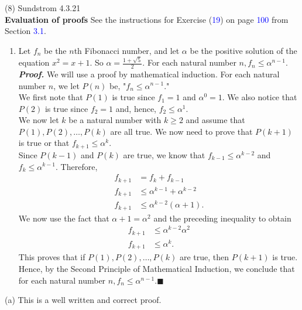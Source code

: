 \documentclass{article}
\begin{document}
(8) Sundstrom 4.3.21\\
\textbf{Evaluation of proofs}
See the instructions for Exercise (\textcolor{blue}{19}) on page \textcolor{blue}{100} from Section \textcolor{blue}{3.1}.
\begin{enumerate}[leftmargin=35px,label=(\textbf{\alph*})]
\item Let $f_n$ be the $n$th Fibonacci number, and let $\alpha$ be the positive solution of the equation $x^2 = x + 1$. So $\alpha = \frac{1 + \sqrt{5}}{2}.$ For each natural number $n, f_n \leq \alpha^{n - 1}.$\\
\textit{\textbf{Proof.}} We will use a proof by mathematical induction. For each natural number $n$, we let $P(n)$ be, "$f_n \leq \alpha^{n - 1}.$"\\
We first note that $P(1)$ is true since $f_1 = 1$ and $\alpha^0 = 1$. We also notice that $P(2)$ is true since $f_2 = 1$ and, hence, $f_2 \leq \alpha^1$.\\
We now let $k$ be a natural number with $k \geq 2$ and assume that $P(1), P(2),\ldots, P(k)$ are all true. We now need to prove that $P(k + 1)$ is true or that $f_{k + 1} \leq \alpha^k.$\\
Since $P(k - 1)$ and $P(k)$ are true, we know that $f_{k - 1} \leq \alpha^{k - 2}$ and $f_k \leq \alpha^{k - 1}.$ Therefore,
\begin{align*}
f_{k + 1} &= f_k + f_{k - 1}\\
f_{k + 1} &\leq \alpha^{k - 1} + \alpha^{k - 2}\\
f_{k + 1} &\leq \alpha^{k - 2}(\alpha + 1).
\end{align*}
We now use the fact that $\alpha + 1 = \alpha^2$ and the preceding inequality to obtain
\begin{align*}
f_{k + 1} &\leq \alpha^{k - 2}\alpha^2\\
f_{k + 1} &\leq \alpha^k.
\end{align*}
This proves that if $P(1), P(2),\ldots, P(k)$ are true, then $P(k + 1)$ is true. Hence, by the Second Principle of Mathematical Induction, we conclude that for each natural number $n, f_n \leq \alpha^{n - 1}.$\hfill$\blacksquare$
\end{enumerate}

(a) This is a well written and correct proof.
\end{document}
